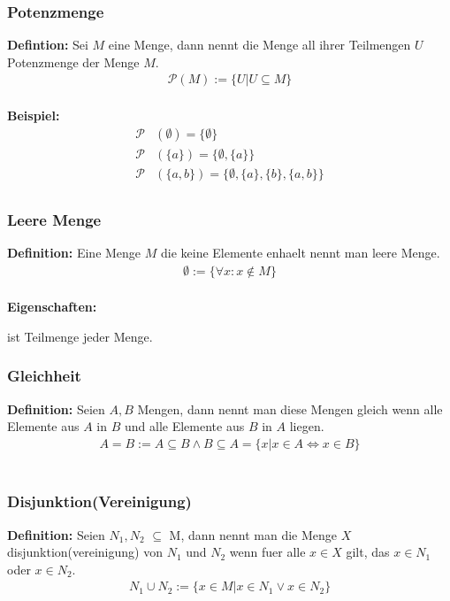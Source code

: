 \documentclass[../AbiMappe_Mathe.tex]{subfiles}
\begin{document}
\subsubsection{Potenzmenge}
\textbf{Defintion:} Sei $M$ eine Menge, dann nennt die Menge all ihrer Teilmengen $U$ Potenzmenge der Menge $M$.
\begin{align*}
\mathcal{P}(M) := \{U|U \subseteq M  \}
\end{align*}
\\\textbf{Beispiel:} 
\begin{align*}
\mathcal P&(\emptyset) = \{ \emptyset \}\\
\mathcal P&(\{ a \}) = \bigl\{ \emptyset, \{ a \} \bigr\}\\
\mathcal P&(\{ a, b \}) = \bigl\{ \emptyset, \{ a \}, \{ b \}, \{ a, b \} \bigr\}\\
\end{align*}

\subsubsection{Leere Menge}
\textbf{Definition:} Eine Menge $M$ die keine Elemente enhaelt nennt man leere Menge.
\begin{align*}
\emptyset:= \{\forall x:x\notin M\}  
\end{align*}\\
\textbf{Eigenschaften:}\\
\begin{description}
\vspace{-1cm}
\item[$\bullet$] ist Teilmenge jeder Menge.
\end{description}

\subsubsection{Gleichheit}
\textbf{Definition:} Seien $A,B$ Mengen, dann nennt man diese Mengen gleich wenn alle Elemente aus $A$ in $B$ und alle Elemente aus $B$ in $A$ liegen.
\begin{align*}
A = B:= A \subseteq B \land B \subseteq A =\{x|x \in A \Leftrightarrow x \in B\}
\end{align*}
\\
\subsubsection{Disjunktion(Vereinigung)}
\textbf{Definition:} Seien $N_1,N_2$ $\subseteq$ M, dann nennt man die Menge $X$ disjunktion(vereinigung) von $N_1$ und  $N_2$ wenn fuer alle $x \in X$ gilt, das $x \in N_1$ oder $x \in N_2$.
\begin{align*}
N_1 \cup N_2:=\{x \in M| x \in N_1 \lor x \in N_2 \}
\end{align*}
\\
\end{document}
